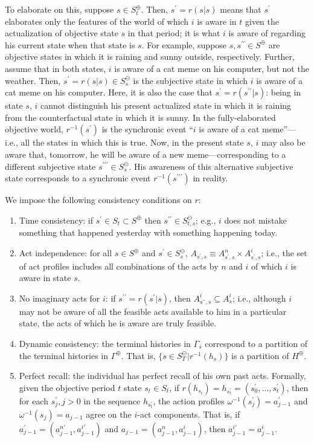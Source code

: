 \documentclass[
11pt,
titlepage,
reqno,
]{article}%
\theoremstyle{definition}
\begin{document}
To elaborate on this, suppose $s\in S^\oplus_t$.
Then,  $s^{\prime}=r(s|s)$ means that $s^\prime$ elaborates only the features of the world of which $i$ is aware in $t$ given the actualization of objective state $s$ in that period; it is what $i$ is aware of regarding his current state when that state is $s$.
For example, suppose $s,s^{\prime\prime}\in S^\oplus$ are objective states in which it is raining and sunny outside, respectively.
Further, assume that in both states,  $i$ is aware of a cat meme on his computer, but not the weather. 
Then, $s^{\prime}=r(s|s)\in S^\ominus_s$ is the subjective state in which $i$ is aware of a cat meme on his computer.
Here, it is also the case that $s^{\prime}=r(s^{\prime\prime}|s)$: being in state $s$, $i$ cannot distinguish his present actualized  state in which it is raining from the counterfactual state in which it is sunny.
In the fully-elaborated objective world, $r^{-1}(s^{\prime})$ is the synchronic event ``$i$ is aware of a cat meme''---i.e., all the states in which this is true.
Now, in the present state $s$, $i$ may also be aware that, tomorrow, he will be aware of a new meme---corresponding to a different subjective state $s^{\prime\prime\prime}\in S^\ominus_s$.
His awareness of this alternative subjective state corresponds to a synchronic event $r^{-1}(s^{\prime\prime\prime})$ in reality.
 

We impose the following consistency conditions on $r$:
\begin{enumerate}
	\item Time consistency: if $s^\prime\in S_t\subset S^\oplus$ then $s^{\prime\prime}\in S^\ominus_{t,s}$; e.g., $i$ does not mistake something that happened yesterday with something happening today.
	\item Act independence: for all $s\in S^\oplus$ and $s^\prime\in S^\ominus_s$, $A_{s^\prime,s}\equiv A^n_{s^\prime,s}\times A^i_{s^\prime,s}$; i.e., the set of act profiles includes all combinations of the acts by $n$ and $i$ of which $i$ is aware in state $s$.
	\item No imaginary acts for $i$: if $s^{\prime\prime}=r(s^\prime|s)$, then $A^i_{s^{\prime\prime},s}\subseteq A^i_{s}$; i.e., although $i$ may not be aware of all the feasible acts available to him in a particular state, the acts of which he is aware are truly feasible.
	\item Dynamic consistency: the terminal histories in $\Gamma_s$ correspond to a partition of the terminal histories in $\Gamma^\oplus$. That is, $\{s\in S^\ominus_T|r^{-1}(h_s)\}$ is a partition of $H^\oplus$.
	\item Perfect recall: the individual has perfect recall of his own past acts. Formally, given the objective period $t$ state  $s_t\in S_t$, if $r(h_{s_t})=h_{s^\prime_t}=(s^\prime_0,\ldots,s^\prime_t)$, then for each $s^\prime_j,j>0$ in the sequence $h_{s^\prime_t}$, the action profiles $\omega^{-1}(s^\prime_j)=a^\prime_{j-1}$ and $\omega^{-1}(s_j)=a_{j-1}$ agree on the $i$-act components. That is, if $a^\prime_{j-1}=(a^{n\prime}_{j-1},a^{i\prime}_{j-1})$ and $a_{j-1}=(a^n_{j-1},a^i_{j-1})$, then $a^{i\prime}_{j-1}=a^i_{j-1}$.
\end{enumerate}
\end{document}
